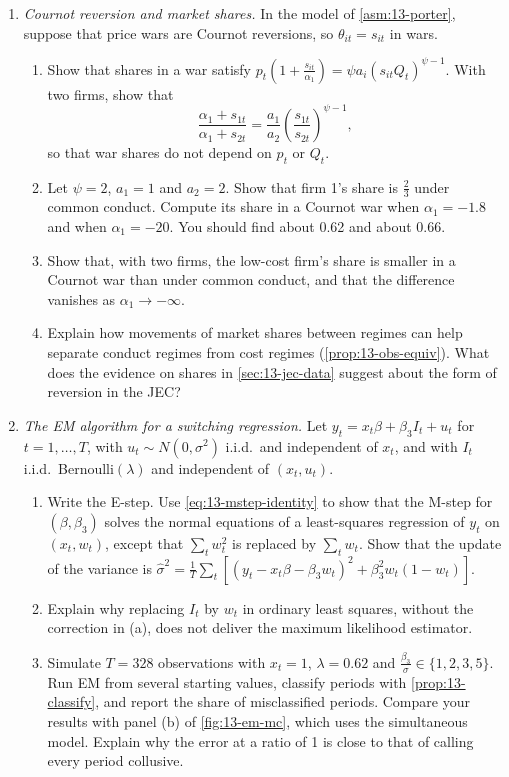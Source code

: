 \begin{enumerate}[label=\arabic*., leftmargin=*, itemsep=6pt]
\item \textit{Cournot reversion and market shares.} In the model of \cref{asm:13-porter}, suppose that price wars
are Cournot reversions, so $\theta_{it} = s_{it}$ in wars.
\begin{enumerate}[label=(\alph*)]
  \item Show that shares in a war satisfy $p_t\left(1 + \frac{s_{it}}{\alpha_1}\right) = \psi a_i (s_{it}Q_t)^{\psi
  - 1}$. With two firms, show that
  \begin{equation*}
    \frac{\alpha_1 + s_{1t}}{\alpha_1 + s_{2t}} = \frac{a_1}{a_2}\left(\frac{s_{1t}}{s_{2t}}\right)^{\psi - 1},
  \end{equation*}
  so that war shares do not depend on $p_t$ or $Q_t$.
  \item Let $\psi = 2$, $a_1 = 1$ and $a_2 = 2$. Show that firm 1's share is $\frac{2}{3}$ under common conduct.
  Compute its share in a Cournot war when $\alpha_1 = -1.8$ and when $\alpha_1 = -20$. You should find about 0.62
  and about 0.66.
  \item Show that, with two firms, the low-cost firm's share is smaller in a Cournot war than under common conduct,
  and that the difference vanishes as $\alpha_1 \to -\infty$.
  \item Explain how movements of market shares between regimes can help separate conduct regimes from cost regimes
  (\cref{prop:13-obs-equiv}). What does the evidence on shares in \cref{sec:13-jec-data} suggest about the form of
  reversion in the JEC?
\end{enumerate}

\item \textit{The EM algorithm for a switching regression.} Let $y_t = x_t\beta + \beta_3 I_t + u_t$ for
$t = 1, \dots, T$, with $u_t \sim N(0, \sigma^2)$ i.i.d.\ and independent of $x_t$, and with $I_t$ i.i.d.\
Bernoulli$(\lambda)$ and independent of $(x_t, u_t)$.
\begin{enumerate}[label=(\alph*)]
  \item Write the E-step. Use \eqref{eq:13-mstep-identity} to show that the M-step for $(\beta, \beta_3)$ solves the
  normal equations of a least-squares regression of $y_t$ on $(x_t, w_t)$, except that $\sum_t w_t^2$ is replaced
  by $\sum_t w_t$. Show that the update of the variance is
  $\hat\sigma^2 = \frac{1}{T}\sum_t\left[(y_t - x_t\beta - \beta_3 w_t)^2 + \beta_3^2 w_t(1 - w_t)\right]$.
  \item Explain why replacing $I_t$ by $w_t$ in ordinary least squares, without the correction in (a), does not
  deliver the maximum likelihood estimator.
  \item Simulate $T = 328$ observations with $x_t = 1$, $\lambda = 0.62$ and
  $\frac{\beta_3}{\sigma} \in \{1, 2, 3, 5\}$. Run EM from several starting values, classify periods with
  \cref{prop:13-classify}, and report the share of misclassified periods. Compare your results with panel (b) of
  \cref{fig:13-em-mc}, which uses the simultaneous model. Explain why the error at a ratio of 1 is close to that of
  calling every period collusive.
\end{enumerate}


\end{enumerate}
